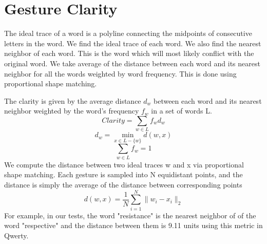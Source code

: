 \documentclass[MTech]{iitmdiss}
\begin{document}
\section{Gesture Clarity}
The ideal trace of a word is a polyline connecting the midpoints of consecutive letters in the word. We find the ideal trace of each word. We also find the nearest neighbor of each word. This is the word which will most likely conflict with the original word. We take average of the distance between each word and its nearest neighbor for all the words weighted by word frequency. This is done using proportional shape matching.

The clarity is given by the average distance $d_{w}$ between each word and its nearest neighbor weighted by the word's frequency $f_{w}$ in a set of words L.
\begin{equation}Clarity=\sum_{w \in L} f_{w} d_{w}\end{equation}
\begin{equation} d_{w}= \min_{x \in L - \{w\} } d(w,x) \end{equation} 
\begin{equation} \sum_{w \in L } f_{w} = 1\end{equation}
We compute the distance between two ideal traces w and x via proportional shape matching. Each gesture is sampled into N equidistant points, and the distance is simply the average of the distance between corresponding points
\begin{equation}
d(w,x) = \frac{1}{N} \sum_{i=1}^{N} \| w_{i} - x_{i} \|_{2}
\end{equation}
For example, in our tests, the word "resistance" is the nearest neighbor of of the word "respective" and the distance between them is 9.11 units using this metric in Qwerty. 
\end{document}
